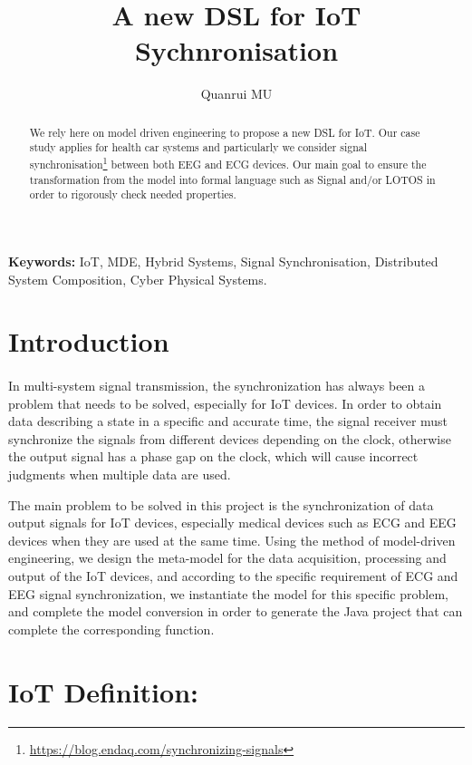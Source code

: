\documentclass{article}
\title{A new DSL for IoT Sychnronisation}
\author{Quanrui MU}
\begin{document}
\maketitle

\begin{abstract}
We rely here on model driven engineering to propose a new DSL for IoT. Our case study applies for health car systems and particularly we consider signal synchronisation\footnote{\url{https://blog.endaq.com/synchronizing-signals}} between both EEG and ECG devices.  Our main goal to ensure the transformation from the model into formal language such as Signal and/or LOTOS in order to rigorously check needed properties. 
\end{abstract}

\textbf{Keywords:} IoT, MDE, Hybrid Systems, Signal Synchronisation, Distributed System Composition, Cyber Physical Systems. 

\section{Introduction}

\paragraph{}

In multi-system signal transmission, the synchronization has always been a problem that needs to be solved, especially for IoT devices. In order to obtain data describing a state in a specific and accurate time, the signal receiver must synchronize the signals from different devices depending on the clock, otherwise the output signal has a phase gap on the clock, which will cause incorrect judgments when multiple data are used. 

The main problem to be solved in this project is the synchronization of data output signals for IoT devices, especially medical devices such as ECG and EEG devices when they are used at the same time. Using the method of model-driven engineering, we design the meta-model for the data acquisition, processing and output of the IoT devices, and according to the specific requirement of ECG and EEG signal synchronization, we instantiate the model for this specific problem, and complete the model conversion in order to generate the Java project that can complete the corresponding function.

\section{IoT Definition:} 
\end{document}
